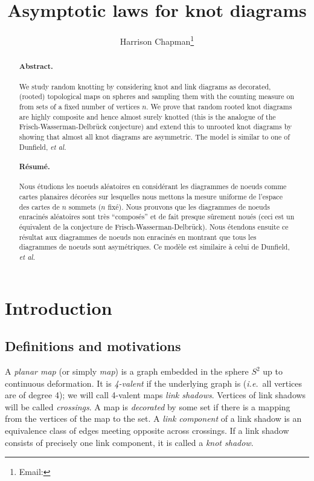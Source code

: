 \documentclass[submission%
]{dmtcs}
\author{Harrison Chapman\addressmark{1}\thanks{Email: \email{hchapman@math.uga.edu}}}
\title[Asymptotic laws for knot diagrams]{Asymptotic laws for knot diagrams}
\begin{document}
\maketitle
\begin{abstract}
  \paragraph{Abstract.}
  We study random knotting by considering knot and link diagrams as
  decorated, (rooted) topological maps on spheres and sampling them
  with the counting measure on from sets of a fixed number of vertices
  $n$. We prove that random rooted knot diagrams are highly composite
  and hence almost surely knotted (this is the analogue of the
  Frisch-Wasserman-Delbr\"uck conjecture) and extend this to unrooted
  knot diagrams by showing that almost all knot diagrams are
  asymmetric. The model is similar to one of Dunfield, \textit{et al.}

  \paragraph{R\'esum\'e.} Nous \'etudions les noeuds al\'eatoires en
  consid\'erant les diagrammes de noeuds comme cartes planaires
  d\'ecor\'ees sur lesquelles nous mettons la mesure uniforme de
  l'espace des cartes de $n$ sommets ($n$ fix\'e). Nous prouvons que
  les diagrammes de noeuds enracin\'es al\'eatoires sont tr\`es
  ``compos\'es'' et de fait presque s\^{u}rement nou\'es (ceci est un
  \'equivalent de la conjecture de Frisch-Wasserman-Delbr\"uck). Nous
  \'etendons ensuite  ce r\'esultat aux diagrammes de noeuds
  non enracin\'es en montrant que tous les diagrammes de noeuds sont
  asym\'etriques. Ce mod\`ele est similaire \`a celui de Dunfield,
  \textit{et al.}
\end{abstract}

\section{Introduction}
\label{sec:in}

\subsection{Definitions and motivations}
\label{sec:defin-motiv}

A \emph{planar map} (or simply \emph{map}) is a graph embedded in the
sphere $S^2$ up to continuous deformation. It is \emph{4-valent} if
the underlying graph is (\textit{i.e.}\ all vertices are of degree 4); we will
call 4-valent maps \emph{link shadows}. Vertices of link shadows will
be called \emph{crossings}. A map is \emph{decorated} by some set if
there is a mapping from the vertices of the map to the set. A
\emph{link component} of a link shadow is an equivalence class of
edges meeting opposite across crossings. If a link shadow consists of
precisely one link component, it is called a \emph{knot shadow}.
\end{document}
